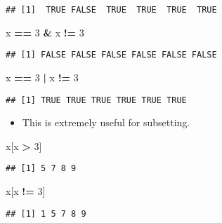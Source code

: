 \documentclass[]{book}
\newenvironment{Shaded}{\begin{snugshade}}{\end{snugshade}}
\newcommand{\DecValTok}[1]{\textcolor[rgb]{0.00,0.00,0.81}{#1}}
\newcommand{\NormalTok}[1]{#1}
\newcommand{\OperatorTok}[1]{\textcolor[rgb]{0.81,0.36,0.00}{\textbf{#1}}}
\newcommand{\StringTok}[1]{\textcolor[rgb]{0.31,0.60,0.02}{#1}}
\providecommand{\tightlist}{%
  \setlength{\itemsep}{0pt}\setlength{\parskip}{0pt}}
\begin{document}
\begin{verbatim}
## [1]  TRUE FALSE  TRUE  TRUE  TRUE  TRUE
\end{verbatim}

\begin{Shaded}
\begin{Highlighting}[]
\NormalTok{x }\OperatorTok{==}\StringTok{ }\DecValTok{3} \OperatorTok{&}\StringTok{ }\NormalTok{x }\OperatorTok{!=}\StringTok{ }\DecValTok{3}
\end{Highlighting}
\end{Shaded}

\begin{verbatim}
## [1] FALSE FALSE FALSE FALSE FALSE FALSE
\end{verbatim}

\begin{Shaded}
\begin{Highlighting}[]
\NormalTok{x }\OperatorTok{==}\StringTok{ }\DecValTok{3} \OperatorTok{|}\StringTok{ }\NormalTok{x }\OperatorTok{!=}\StringTok{ }\DecValTok{3}
\end{Highlighting}
\end{Shaded}

\begin{verbatim}
## [1] TRUE TRUE TRUE TRUE TRUE TRUE
\end{verbatim}

\begin{itemize}
\tightlist
\item
  This is extremely useful for subsetting.
\end{itemize}

\begin{Shaded}
\begin{Highlighting}[]
\NormalTok{x[x }\OperatorTok{>}\StringTok{ }\DecValTok{3}\NormalTok{]}
\end{Highlighting}
\end{Shaded}

\begin{verbatim}
## [1] 5 7 8 9
\end{verbatim}

\begin{Shaded}
\begin{Highlighting}[]
\NormalTok{x[x }\OperatorTok{!=}\StringTok{ }\DecValTok{3}\NormalTok{]}
\end{Highlighting}
\end{Shaded}

\begin{verbatim}
## [1] 1 5 7 8 9
\end{verbatim}
\end{document}
